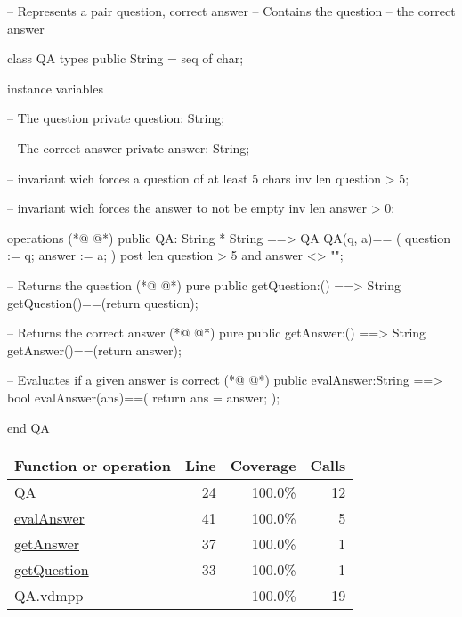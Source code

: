 \begin{vdmpp}[breaklines=true]
-- Represents a pair question, correct answer
-- Contains the question
--      the correct answer

class QA
 types 
   public String = seq of char;
   
  instance variables
  
   -- The question
   private question: String;
   
   -- The correct answer
   private answer: String;
   
   -- invariant wich forces a question of at least 5 chars
   inv len question > 5;
   
   -- invariant wich forces the answer to not be empty
   inv len answer > 0;
  
  operations
(*@
\label{QA:24}
@*)
   public QA: String * String ==> QA
   QA(q, a)== 
   (
     question := q;
     answer := a;
   )
   post len question > 5 and answer <> "";
   
   -- Returns the question
(*@
\label{getQuestion:33}
@*)
   pure public getQuestion:() ==> String
    getQuestion()==(return question); 
    
    -- Returns the correct answer
(*@
\label{getAnswer:37}
@*)
    pure public getAnswer:() ==> String
    getAnswer()==(return answer); 
   
   -- Evaluates if a given answer is correct
(*@
\label{evalAnswer:41}
@*)
   public evalAnswer:String ==> bool
    evalAnswer(ans)==(
     return ans = answer;
    ); 

end QA
\end{vdmpp}
\bigskip
\begin{longtable}{|l|r|r|r|}
\hline
Function or operation & Line & Coverage & Calls \\
\hline
\hline
\hyperref[QA:24]{QA} & 24&100.0\% & 12 \\
\hline
\hyperref[evalAnswer:41]{evalAnswer} & 41&100.0\% & 5 \\
\hline
\hyperref[getAnswer:37]{getAnswer} & 37&100.0\% & 1 \\
\hline
\hyperref[getQuestion:33]{getQuestion} & 33&100.0\% & 1 \\
\hline
\hline
QA.vdmpp & & 100.0\% & 19 \\
\hline
\end{longtable}

